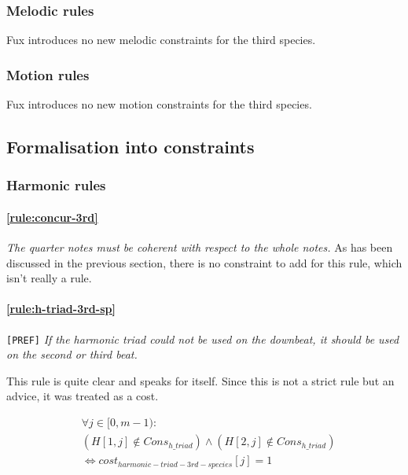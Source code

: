 \subsubsection{Melodic rules}
Fux introduces no new melodic constraints for the third species.
\subsubsection{Motion rules}
Fux introduces no new motion constraints for the third species.

\subsection{Formalisation into constraints}
\subsubsection{Harmonic rules}
\paragraph{\hspace{.5cm}\ref{rule:concur-3rd}} \textit{The quarter notes must be coherent with respect to the whole notes.}
As has been discussed in the previous section, there is no constraint to add for this rule, which isn't really a rule.

\paragraph{\hspace{.6cm}\ref{rule:h-triad-3rd-sp}} \texttt{[PREF]} \textit{If the harmonic triad could not be used on the downbeat, it should be used on the second or third beat.}    

    This rule is quite clear and speaks for itself. Since this is not a strict rule but an advice, it was treated as a cost.

    \begin{equation} \begin{aligned}
            &\forall j \in [0, m-1) \colon \\
            &(H[1, j] \notin Cons_{h\_triad}) \land  (H[2, j] \notin Cons_{h\_triad})\\
            &\iff cost_{harmonic-triad-3rd-species}[j] = 1       
    \end{aligned} \end{equation}




